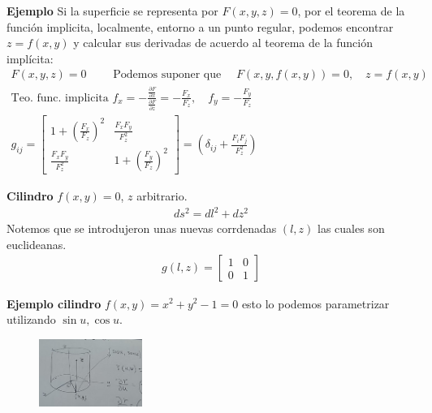 \documentclass{article}
\begin{document}
\textbf{Ejemplo } Si la superficie se representa por $ F\left(x,y,z \right)=0  $, por el teorema de la función implicita, localmente, entorno a un punto regular, podemos encontrar $ z = f\left(x,y\right) $ y calcular sus derivadas de acuerdo al teorema de la función implícita: 
\begin{gather}
  F\left(x,y,z\right)=0\qquad \text{ Podemos suponer que  }\quad F\left(x,y,f\left(x,y\right)\right)=0, \quad z = f\left(x,y\right)\\
  \text{Teo. func. implicita } f_x  = - \frac{\frac{\partial F }{\partial x}}{\frac{\partial F }{\partial z}} = - \frac{F_x }{F_z }, \quad f_y = - \frac{F_y }{F_z}\\
  g _{ij }  = \begin{bmatrix}
      1+ \left(\frac{F_x }{F_z }\right)^2 & \frac{F_x F_y }{F_z ^2} \\
      \frac{F_x F_y }{F_z ^2} & 1+ \left(\frac{F_y }{F_z }\right)^2
  \end{bmatrix} = \left(\delta _{ij } + \frac{F_i F_j }{F_z ^2}\right) 
\end{gather}

\textbf{Cilindro } $ f\left(x,y\right)=0  $, $ z  $ arbitrario.
\begin{gather}
  ds ^2 = dl ^2 + dz ^2 
\end{gather}
Notemos que se introdujeron unas nuevas corrdenadas $ (l,z) $ las cuales son euclideanas. 
\begin{gather}
  g\left(l,z\right)=\begin{bmatrix}
      1 & 0 \\
      0 & 1
  \end{bmatrix}   
\end{gather}

\textbf{Ejemplo cilindro } $ f\left(x,y\right)=x ^2 + y ^2 -1 = 0  $ esto lo podemos parametrizar utilizando $ \sin{u}, \cos{u } $.
\begin{figure}[H]
  \begin{center}
    \includegraphics[width=0.3\textwidth]{cilindro.png}
  \end{center}
\end{figure}
\end{document}
